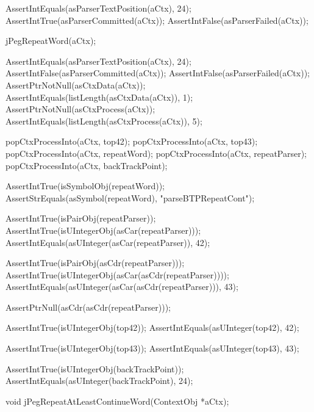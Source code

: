   AssertIntEquals(asParserTextPosition(aCtx), 24);
  AssertIntTrue(asParserCommitted(aCtx));
  AssertIntFalse(asParserFailed(aCtx));
  
  jPegRepeatWord(aCtx);
  
  AssertIntEquals(asParserTextPosition(aCtx), 24);
  AssertIntFalse(asParserCommitted(aCtx));
  AssertIntFalse(asParserFailed(aCtx));
  AssertPtrNotNull(asCtxData(aCtx));
  AssertIntEquals(listLength(asCtxData(aCtx)), 1);
  AssertPtrNotNull(asCtxProcess(aCtx));
  AssertIntEquals(listLength(asCtxProcess(aCtx)), 5);
    
  popCtxProcessInto(aCtx, top42);
  popCtxProcessInto(aCtx, top43);
  popCtxProcessInto(aCtx, repeatWord);
  popCtxProcessInto(aCtx, repeatParser);
  popCtxProcessInto(aCtx, backTrackPoint);
  
  AssertIntTrue(isSymbolObj(repeatWord));
  AssertStrEquals(asSymbol(repeatWord), "parseBTPRepeatCont");
  
  AssertIntTrue(isPairObj(repeatParser));
  AssertIntTrue(isUIntegerObj(asCar(repeatParser)));
  AssertIntEquals(asUInteger(asCar(repeatParser)), 42);
  
  AssertIntTrue(isPairObj(asCdr(repeatParser)));
  AssertIntTrue(isUIntegerObj(asCar(asCdr(repeatParser))));
  AssertIntEquals(asUInteger(asCar(asCdr(repeatParser))), 43);
  
  AssertPtrNull(asCdr(asCdr(repeatParser)));
  
  AssertIntTrue(isUIntegerObj(top42));
  AssertIntEquals(asUInteger(top42), 42);  

  AssertIntTrue(isUIntegerObj(top43));
  AssertIntEquals(asUInteger(top43), 43);
  
  AssertIntTrue(isUIntegerObj(backTrackPoint));
  AssertIntEquals(asUInteger(backTrackPoint), 24);
\stopCTest
\stopTestCase
\stopTestSuite

\startTestSuite[jPegRepeatAtLeastContinueWord]

\startCHeader
void jPegRepeatAtLeastContinueWord(ContextObj *aCtx);
\stopCHeader

